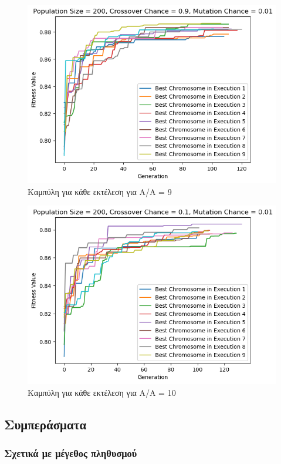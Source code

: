 \documentclass[12pt,a4paper]{article}
\begin{document}
\begin{figure}[H]
	\includegraphics[width=\textwidth]{Figures/18. All for AA = 9.png}
	\caption{Καμπύλη για κάθε εκτέλεση για A/A = 9}
\end{figure}

\begin{figure}[H]
	\includegraphics[width=\textwidth]{Figures/20. All for AA = 10.png}
	\caption{Καμπύλη για κάθε εκτέλεση για A/A = 10}
\end{figure}

\subsection{Συμπεράσματα}

\subsubsection{Σχετικά με μέγεθος πληθυσμού}
\end{document}
